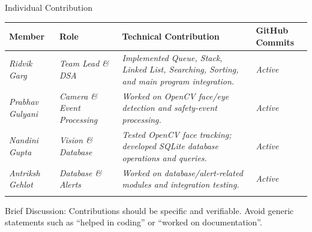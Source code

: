 \documentclass[aspectratio=169,11pt]{beamer}
\newcommand{\smallnote}[1]{%
\vspace{0.08cm}
{\scriptsize\color{GEUGrey}#1}
}
\newcommand{\placeholder}[1]{%
\textit{\color{GEUGrey}#1}
}
\begin{document}
\begin{frame}{Individual Contribution}

\scriptsize

\begin{center}

\renewcommand{\arraystretch}{1.35}

\begin{tabularx}{.96\textwidth}
{@{}p{2.0cm}p{2.0cm}X p{1.6cm}@{}}

\toprule
Member &
Role &
Technical Contribution &
GitHub Commits\\
\midrule
\placeholder{Ridvik Garg} & \placeholder{Team Lead \& DSA} & \placeholder{Implemented Queue, Stack, Linked List, Searching, Sorting, and main program integration.} & \placeholder{Active} \\ 
\placeholder{Prabhav Gulyani} & \placeholder{Camera \& Event Processing} & \placeholder{Worked on OpenCV face/eye detection and safety-event processing.} & \placeholder{Active} \\ 
\placeholder{Nandini Gupta} & \placeholder{Vision \& Database} & \placeholder{Tested OpenCV face tracking; developed SQLite database operations and queries.} & \placeholder{Active} \\ 
\placeholder{Antriksh Gehlot} & \placeholder{Database \& Alerts} & \placeholder{Worked on database/alert-related modules and integration testing.} & \placeholder{Active} \\
\placeholder{}\\

\bottomrule

\end{tabularx}

\end{center}

\vspace{3mm}

\begin{block}

\end{block}

\smallnote{
Brief Discussion: Contributions should be specific and verifiable.
Avoid generic statements such as ``helped in coding'' or
``worked on documentation''.
}

\end{frame}
\end{document}
